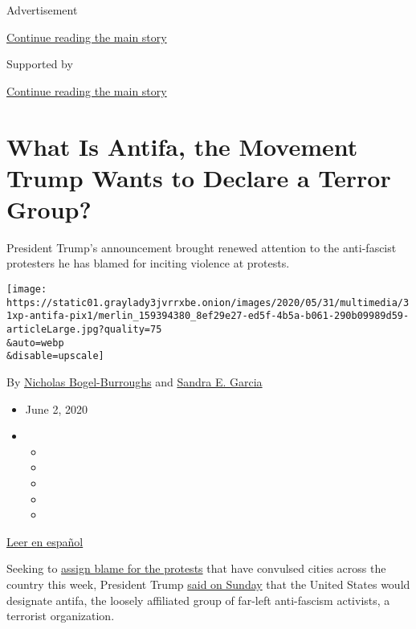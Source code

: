 Advertisement

\protect\hyperlink{after-top}{Continue reading the main story}

Supported by

\protect\hyperlink{after-sponsor}{Continue reading the main story}

\hypertarget{what-is-antifa-the-movement-trump-wants-to-declare-a-terror-group}{%
\section{What Is Antifa, the Movement Trump Wants to Declare a Terror
Group?}\label{what-is-antifa-the-movement-trump-wants-to-declare-a-terror-group}}

President Trump's announcement brought renewed attention to the
anti-fascist protesters he has blamed for inciting violence at protests.

\texttt{[image: https://static01.graylady3jvrrxbe.onion/images/2020/05/31/multimedia/31xp-antifa-pix1/merlin\_159394380\_8ef29e27-ed5f-4b5a-b061-290b09989d59-articleLarge.jpg?quality=75\\\&auto=webp\\\&disable=upscale]}

By
\href{https://www.nytimes3xbfgragh.onion/by/nicholas-bogel-burroughs}{Nicholas
Bogel-Burroughs} and
\href{https://www.nytimes3xbfgragh.onion/by/sandra-e-garcia}{Sandra E.
Garcia}

\begin{itemize}
\item
  June 2, 2020
\item
  \begin{itemize}
  \item
  \item
  \item
  \item
  \item
  \end{itemize}
\end{itemize}

\href{https://www.nytimes3xbfgragh.onion/es/2020/06/02/espanol/mundo/que-es-antifa.html}{Leer
en español}

Seeking to
\href{https://www.nytimes3xbfgragh.onion/2020/05/31/us/politics/trump-antifa-terrorist-group.html?referringSource=articleShare}{assign
blame for the protests} that have convulsed cities across the country
this week, President Trump
\href{https://twitter.com/realDonaldTrump/status/1267129644228247552}{said
on Sunday} that the United States would designate antifa, the loosely
affiliated group of far-left anti-fascism activists, a terrorist
organization.

